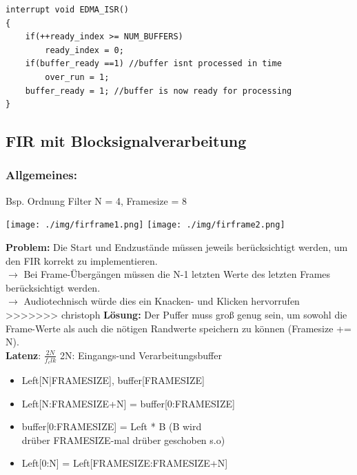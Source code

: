 \documentclass[10pt,a4paper]{article}
\begin{document}
\begin{verbatim}
interrupt void EDMA_ISR()
{
    if(++ready_index >= NUM_BUFFERS)
        ready_index = 0;
    if(buffer_ready ==1) //buffer isnt processed in time
        over_run = 1;
    buffer_ready = 1; //buffer is now ready for processing
}
\end{verbatim}

\subsection{FIR mit Blocksignalverarbeitung}
\subsubsection{Allgemeines:}
Bsp. Ordnung Filter N = 4, Framesize = 8\\
  \begin{center}
      \texttt{[image: ./img/firframe1.png]}
      \texttt{[image: ./img/firframe2.png]}
  \end{center}
\textbf{Problem:} Die Start und Endzustände müssen jeweils berücksichtigt werden, um den FIR korrekt zu implementieren.\\ 
$\rightarrow$ Bei Frame-Übergängen müssen die N-1 letzten Werte des letzten Frames berücksichtigt werden.\\
$\rightarrow$ Audiotechnisch würde dies ein \grqq{}Knacken-\grqq{} und \grqq{}Klicken\grqq{} hervorrufen\\
>>>>>>> christoph
\textbf{Lösung:} Der Puffer muss groß genug sein, um sowohl die Frame-Werte als auch die nötigen Randwerte speichern zu können (Framesize += N).
\\
\textbf{Latenz}: $\frac{2N}{f_clk}$ 2N: Eingangs-und Verarbeitungsbuffer

\begin{itemize}
    \item Left[N|FRAMESIZE], buffer[FRAMESIZE]
    \item Left[N:FRAMESIZE+N] = buffer[0:FRAMESIZE]
    \item buffer[0:FRAMESIZE] = Left * B (B wird \\drüber FRAMESIZE-mal drüber geschoben s.o)
    \item Left[0:N] = Left[FRAMESIZE:FRAMESIZE+N]
\end{itemize}
\end{document}
